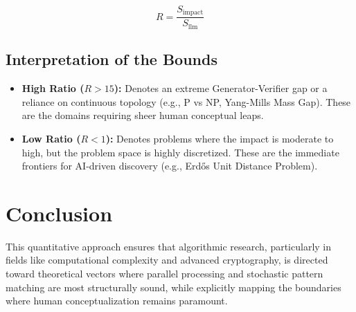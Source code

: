 \documentclass[11pt, letterpaper]{article}
\begin{document}
\begin{equation}
R = \frac{S_{\text{impact}}}{S_{\text{llm}}}
\end{equation}

\subsection{Interpretation of the Bounds}
\begin{itemize}
    \item \textbf{High Ratio ($R > 15$):} Denotes an extreme Generator-Verifier gap or a reliance on continuous topology (e.g., P vs NP, Yang-Mills Mass Gap). These are the domains requiring sheer human conceptual leaps.
    \item \textbf{Low Ratio ($R < 1$):} Denotes problems where the impact is moderate to high, but the problem space is highly discretized. These are the immediate frontiers for AI-driven discovery (e.g., Erd\H{o}s Unit Distance Problem).
\end{itemize}

\section{Conclusion}
This quantitative approach ensures that algorithmic research, particularly in fields like computational complexity and advanced cryptography, is directed toward theoretical vectors where parallel processing and stochastic pattern matching are most structurally sound, while explicitly mapping the boundaries where human conceptualization remains paramount.
\end{document}
